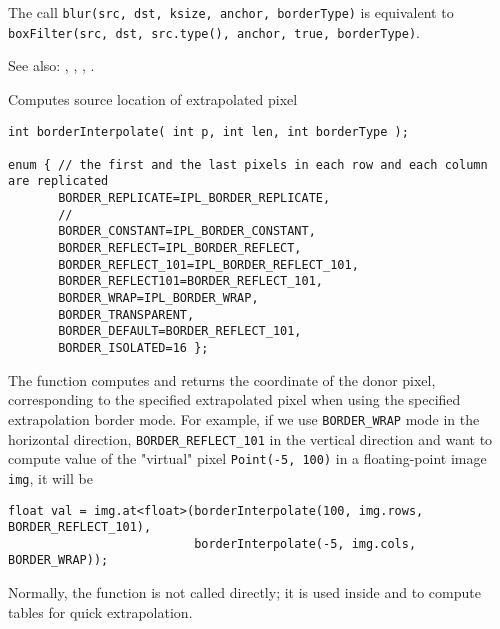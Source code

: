 The call \texttt{blur(src, dst, ksize, anchor, borderType)} is equivalent to
\texttt{boxFilter(src, dst, src.type(), anchor, true, borderType)}.

See also: , , , .

Computes source location of extrapolated pixel

\begin{lstlisting}
int borderInterpolate( int p, int len, int borderType );

enum { // the first and the last pixels in each row and each column are replicated
       BORDER_REPLICATE=IPL_BORDER_REPLICATE,
       // 
       BORDER_CONSTANT=IPL_BORDER_CONSTANT,
       BORDER_REFLECT=IPL_BORDER_REFLECT,
       BORDER_REFLECT_101=IPL_BORDER_REFLECT_101,
       BORDER_REFLECT101=BORDER_REFLECT_101,
       BORDER_WRAP=IPL_BORDER_WRAP,
       BORDER_TRANSPARENT,
       BORDER_DEFAULT=BORDER_REFLECT_101,
       BORDER_ISOLATED=16 };
\end{lstlisting}
\begin{description}
\end{description}

The function computes and returns the coordinate of the donor pixel, corresponding to the specified extrapolated pixel when using the specified extrapolation border mode. For example, if we use \texttt{BORDER\_WRAP} mode in the horizontal direction, \texttt{BORDER\_REFLECT\_101} in the vertical direction and want to compute value of the "virtual" pixel \texttt{Point(-5, 100)} in a floating-point image \texttt{img}, it will be

\begin{lstlisting}
float val = img.at<float>(borderInterpolate(100, img.rows, BORDER_REFLECT_101),
                          borderInterpolate(-5, img.cols, BORDER_WRAP));
\end{lstlisting}

Normally, the function is not called directly; it is used inside  and  to compute tables for quick extrapolation.

